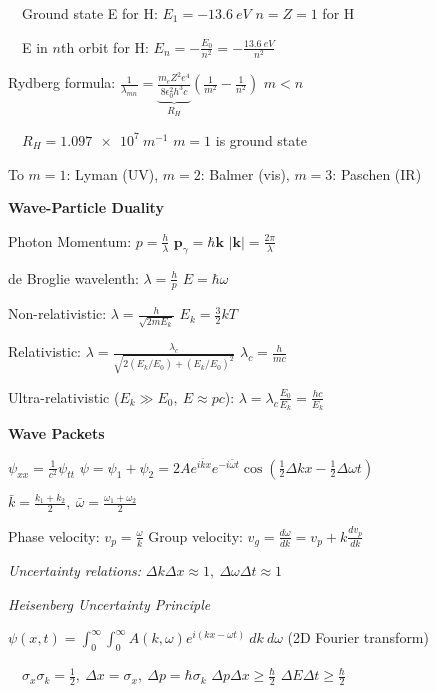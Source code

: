 \documentclass[twocolumn]{article}
\begin{document}
$\quad$Ground state E for H: $E_1 = \SI{-13.6}{eV}$ \hfill $n=Z=1$ for H

$\quad$E in $n$th orbit for H: $E_n = -\frac{E_0}{n^2} = - \frac{\SI{13.6}{eV}}{n^2}$

Rydberg formula: $\frac{1}{\lambda_{mn}} = \underbrace{\frac{m_e Z^2 e^4}{8 \epsilon_0^2 h^3 c}}_{R_H} \left( \frac{1}{m^2} - \frac{1}{n^2} \right)$ \hfill $m < n$

$\quad R_H = \SI{1.097e7}{m^{-1}}$ \hfill $m=1$ is ground state

To $m=1$: Lyman (UV), $m=2$: Balmer (vis), $m=3$: Paschen (IR)


\cleardoublepage


\textbf{Wave-Particle Duality}

Photon Momentum: $p = \frac{h}{\lambda}$ \hfill $\mathbf{p}_\gamma = \hbar \mathbf{k}$ \hfill $|\mathbf{k}| = \frac{2\pi}{\lambda}$

de Broglie wavelenth: $\lambda = \frac{h}{p}$ \hfill $E = \hbar \omega$

Non-relativistic: $\lambda = \frac{h}{\sqrt{2mE_k}}$ \hfill $E_k = \frac{3}{2} kT$

Relativistic: $\lambda = \frac{\lambda_c}{\sqrt{2(E_k / E_0) + (E_k / E_0)^2}}$ \hfill $\lambda_c = \frac{h}{mc}$

Ultra-relativistic ($E_k \gg E_0,\ E \approx pc$): $\lambda = \lambda_c \frac{E_0}{E_k} = \frac{hc}{E_k}$

\dotfill

\textbf{Wave Packets}

$\psi_{xx} = \frac{1}{c^2} \psi_{tt}$ \hfill $\psi = \psi_1 + \psi_2 = 2A e^{i \bar{k} x} e^{-i \bar{\omega} t} \cos \left( \frac{1}{2} \Delta k x - \frac{1}{2} \Delta \omega t \right)$ 

\hfill $\bar{k} = \frac{k_1 + k_2}{2},\ \bar{\omega} = \frac{\omega_1 + \omega_2}{2}$

Phase velocity: $v_p = \frac{\omega}{k}$ \hfill Group velocity: $v_g = \frac{d\omega}{dk} = v_p + k \frac{dv_p}{dk}$

\textit{Uncertainty relations:} $\Delta k \Delta x \approx 1,\ \Delta \omega \Delta t \approx 1$

\textit{Heisenberg Uncertainty Principle}

$\psi(x, t) = \int_0^\infty \int_0^\infty A(k, \omega) e^{i(kx-\omega t)}\ dk\ d\omega$ \hfill (2D Fourier transform)

$\quad \sigma_x \sigma_k = \frac{1}{2},\ \Delta x = \sigma_x,\ \Delta p = \hbar \sigma_k$ \hfill $\Delta p \Delta x \geq \frac{\hbar}{2}$ \hfill $\Delta E \Delta t \geq \frac{\hbar}{2}$
\end{document}
